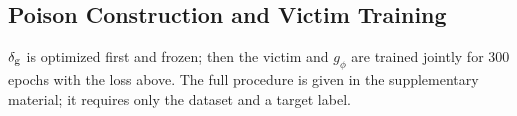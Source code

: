 \subsection{Poison Construction and Victim Training}
\label{sec:training}
$\delta_{\mathrm{g}}$ is optimized first and frozen; then the victim and $g_\phi$ are
trained jointly for $300$ epochs with the loss above. The full procedure is
given in the supplementary material; it requires only the dataset and a target
label.
